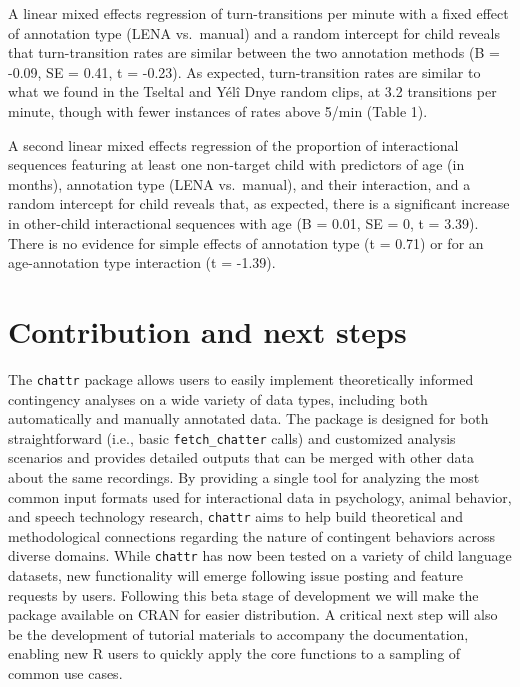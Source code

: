 \documentclass[10pt, letterpaper]{article}
\begin{document}
A linear mixed effects regression of turn-transitions per minute with a
fixed effect of annotation type (LENA vs.~manual) and a random intercept
for child reveals that turn-transition rates are similar between the two
annotation methods (B = -0.09, SE = 0.41, t = -0.23). As expected,
turn-transition rates are similar to what we found in the Tseltal and
Yélî Dnye random clips, at 3.2 transitions per minute, though with fewer
instances of rates above 5/min (Table 1).

A second linear mixed effects regression of the proportion of
interactional sequences featuring at least one non-target child with
predictors of age (in months), annotation type (LENA vs.~manual), and
their interaction, and a random intercept for child reveals that, as
expected, there is a significant increase in other-child interactional
sequences with age (B = 0.01, SE = 0, t = 3.39). There is no evidence
for simple effects of annotation type (t = 0.71) or for an
age-annotation type interaction (t = -1.39).

\hypertarget{contribution-and-next-steps}{%
\section{Contribution and next
steps}\label{contribution-and-next-steps}}

The \texttt{chattr} package allows users to easily implement
theoretically informed contingency analyses on a wide variety of data
types, including both automatically and manually annotated data. The
package is designed for both straightforward (i.e., basic
\texttt{fetch\_chatter} calls) and customized analysis scenarios and
provides detailed outputs that can be merged with other data about the
same recordings. By providing a single tool for analyzing the most
common input formats used for interactional data in psychology, animal
behavior, and speech technology research, \texttt{chattr} aims to help
build theoretical and methodological connections regarding the nature of
contingent behaviors across diverse domains. While \texttt{chattr} has
now been tested on a variety of child language datasets, new
functionality will emerge following issue posting and feature requests
by users. Following this beta stage of development we will make the
package available on CRAN for easier distribution. A critical next step
will also be the development of tutorial materials to accompany the
documentation, enabling new R users to quickly apply the core functions
to a sampling of common use cases.
\end{document}
